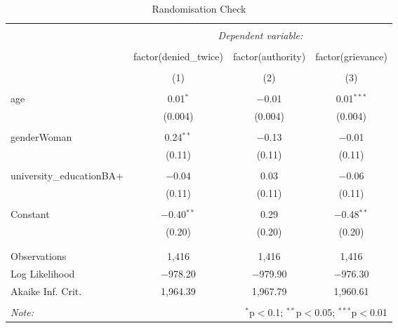 
\begin{table}[!htbp] \centering 
  \caption{Randomisation Check} 
  \label{} 
\begin{tabular}{@{\extracolsep{5pt}}lccc} 
\\[-1.8ex]\hline 
\hline \\[-1.8ex] 
 & \multicolumn{3}{c}{\textit{Dependent variable:}} \\ 
\cline{2-4} 
\\[-1.8ex] & factor(denied\_twice) & factor(authority) & factor(grievance) \\ 
\\[-1.8ex] & (1) & (2) & (3)\\ 
\hline \\[-1.8ex] 
 age & 0.01$^{*}$ & $-$0.01 & 0.01$^{***}$ \\ 
  & (0.004) & (0.004) & (0.004) \\ 
  & & & \\ 
 genderWoman & 0.24$^{**}$ & $-$0.13 & $-$0.01 \\ 
  & (0.11) & (0.11) & (0.11) \\ 
  & & & \\ 
 university\_educationBA+ & $-$0.04 & 0.03 & $-$0.06 \\ 
  & (0.11) & (0.11) & (0.11) \\ 
  & & & \\ 
 Constant & $-$0.40$^{**}$ & 0.29 & $-$0.48$^{**}$ \\ 
  & (0.20) & (0.20) & (0.20) \\ 
  & & & \\ 
\hline \\[-1.8ex] 
Observations & 1,416 & 1,416 & 1,416 \\ 
Log Likelihood & $-$978.20 & $-$979.90 & $-$976.30 \\ 
Akaike Inf. Crit. & 1,964.39 & 1,967.79 & 1,960.61 \\ 
\hline 
\hline \\[-1.8ex] 
\textit{Note:}  & \multicolumn{3}{r}{$^{*}$p$<$0.1; $^{**}$p$<$0.05; $^{***}$p$<$0.01} \\ 
\end{tabular} 
\end{table} 
